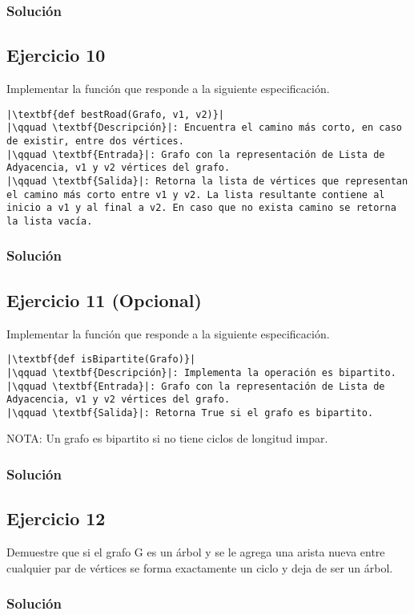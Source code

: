 \documentclass{article}
\begin{document}
\subsubsection*{Solución}


\subsection*{Ejercicio 10}
Implementar la función que responde a la siguiente especificación.
\begin{lstlisting}
|\textbf{def bestRoad(Grafo, v1, v2)}|
|\qquad \textbf{Descripción}|: Encuentra el camino más corto, en caso de existir, entre dos vértices.
|\qquad \textbf{Entrada}|: Grafo con la representación de Lista de Adyacencia, v1 y v2 vértices del grafo.
|\qquad \textbf{Salida}|: Retorna la lista de vértices que representan el camino más corto entre v1 y v2. La lista resultante contiene al inicio a v1 y al final a v2. En caso que no exista camino se retorna la lista vacía.
\end{lstlisting}
\subsubsection*{Solución}


\subsection*{Ejercicio 11 (Opcional)}
Implementar la función que responde a la siguiente especificación.
\begin{lstlisting}
|\textbf{def isBipartite(Grafo)}|
|\qquad \textbf{Descripción}|: Implementa la operación es bipartito.
|\qquad \textbf{Entrada}|: Grafo con la representación de Lista de Adyacencia, v1 y v2 vértices del grafo.
|\qquad \textbf{Salida}|: Retorna True si el grafo es bipartito.
\end{lstlisting}
NOTA: Un grafo es bipartito si no tiene ciclos de longitud impar.
\subsubsection*{Solución}


\subsection*{Ejercicio 12}
Demuestre que si el grafo G es un árbol y se le agrega una arista nueva entre cualquier par de vértices se forma exactamente un ciclo y deja de ser un árbol.
\subsubsection*{Solución}
\end{document}
